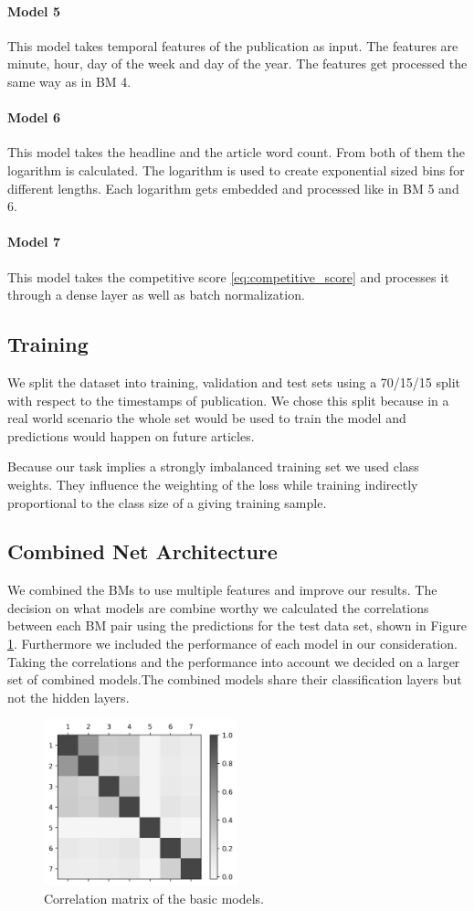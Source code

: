 \paragraph{Model 5} This model takes temporal features of the publication as input. The features are minute, hour, day of the week and day of the year. The features get processed the same way as in BM 4.
\paragraph{Model 6} This model takes the headline and the article word count. From both of them the logarithm is calculated. The logarithm is used to create exponential sized bins for different lengths. Each logarithm gets embedded and processed like in BM 5 and 6.
\paragraph{Model 7} This model takes the competitive score \ref{eq:competitive_score} and processes it through a dense layer as well as batch normalization.

\subsection{Training}
We split the dataset into training, validation and test sets using a 70/15/15 split with respect to the timestamps of publication. We chose this split because in a real world scenario the whole set would be used to train the model and predictions would happen on future articles.

Because our task implies a strongly imbalanced training set we used class weights. They influence the weighting of the loss while training indirectly proportional to the class size of a giving training sample.

\subsection{Combined Net Architecture}
We combined the BMs to use multiple features and improve our results. The decision on what models are combine worthy we calculated the correlations between each BM pair using the predictions for the test data set, shown in Figure \ref{fig:correlation_matrix}. Furthermore we included the performance of each model in our consideration. Taking the correlations and the performance into account we decided on a larger set of combined models.The combined models share their classification layers but not the hidden layers.

\begin{figure}
	\includegraphics[width=0.5\textwidth]{fig/correlations_bw.png}
	\caption{Correlation matrix of the basic models.}
	\label{fig:correlation_matrix}
\end{figure}